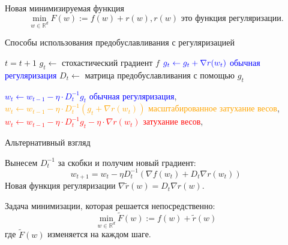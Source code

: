 \documentclass[aspectratio=169, 12pt]{beamer}
\begin{document}
\begin{frame}[shrink]{Новая минимизируемая функция}
\begin{equation*}
        \min_{w \in \mathbb{R}^d} F(w) := f(w) + r(w), \text{$r(w)$ это функция регуляризации.}
\end{equation*}


\begin{algorithm}[H]
    \caption{Способы использования предобуславливания с регуляризацией}
    \label{alg:precond}
    
    \begin{algorithmic}
            
            \State $t = t+1$
            \State $g_t \gets$ стохастический градиент $f$
            \State $\textcolor{blue}{g_t \gets g_t + \nabla r(w_t)}$ \hfill \textcolor{blue}{обычная регуляризация}
            \State $D_t \gets$ матрица предобуславливания с помощью $g_t$

            \State \textcolor{blue}{$w_t \gets w_{t-1} - \eta \cdot D_t^{-1}g_t $} \hfill \textcolor{blue}{обычная регуляризация}, 
            \State \textcolor{orange}{$w_t \gets w_{t-1} - \eta \cdot D_t^{-1} \left(g_t +\nabla r(w_t) \right)$} \hfill \textcolor{orange}{масштабированное затухание весов}, 
            \State \textcolor{red}{$w_t \gets w_{t-1} - \eta \cdot D_t^{-1} g_t  - \eta \cdot \nabla r(w_t)$} \hfill \textcolor{red}{затухание весов}, 
            \EndWhile
    \end{algorithmic}
\end{algorithm}
\end{frame}

\begin{frame}{Альтернативный взгляд}

Вынесем $D_t^{-1}$ за скобки и получим новый градиент:
\begin{equation*}
    w_{t+1} = w_t - \eta D_t^{-1}(\nabla f(w_t) + D_t \nabla r(w_t))
\end{equation*}
Новая функция регуляризации $\nabla \tilde{r}(w) = D_t \nabla r(w)$.


Задача минимизации, которая решается непосредственно:
\begin{equation*}
\label{F_tilde}
    \min_{w \in \mathbb{R}^d} \tilde{F}(w) := f(w) + \tilde{r}(w)
\end{equation*}
где $\tilde{F}(w)$ изменяется на каждом шаге.
\end{frame}
\end{document}
